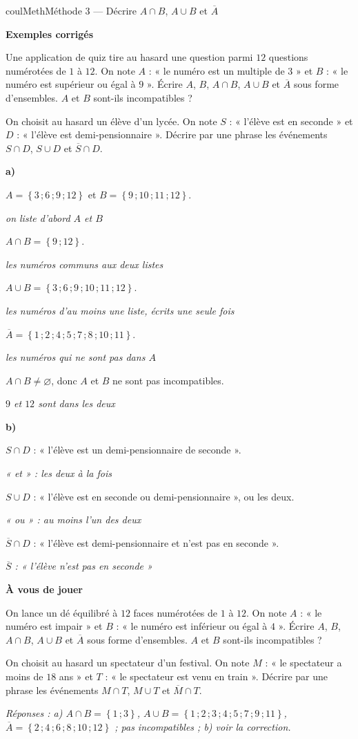 \documentclass[11pt,a4paper]{article}
\makeatletter
\newcommand{\lycee@ens}[1]{\left\{#1\right\}}
\providecommand{\ens}{\lycee@ens}}
\newcounter{lycee@signet}
\newcommand{\signet}[3][]{\stepcounter{lycee@signet}%
  \edef\lycee@dest{\if\relax\detokenize{#1}\relax
    signet.\arabic{lycee@signet}\else#1\fi}%
  \hypertarget{\lycee@dest}{}\bookmark[level=#2,dest=\lycee@dest]{#3}}
\newcommand{\res}[1]{#1}
\newcounter{methode}
\newenvironment{methodebox}[1][Méthode]{\stepcounter{methode}%
  \begin{boitecours}[phantom={\signet[methode-\arabic{methode}]{2}{#1}}]{coulMeth}{#1}}%
  {\end{boitecours}}
\newcommand{\etape}[1]{\par\smallskip\textbf{\color{coulMeth}#1}\par\nobreak\smallskip}
\newcommand{\reponse}[1]{\par\smallskip
  {\footnotesize\itshape\color{black!55}Réponses : #1}}
\newcommand{\explique}[2]{\par\smallskip\noindent
  \begin{minipage}[t]{0.57\linewidth}\raggedright #1\end{minipage}\hfill
  \begin{minipage}[t]{0.40\linewidth}\raggedright\leavevmode
    {\small\itshape\color{black!60}#2}\end{minipage}\par}
\newcommand{\cas}[1]{\par\smallskip\noindent\textbf{\color{coulExo}#1}\vadjust{\nobreak}}
\newenvironment{correction}{\par}{\par}
\newcommand{\etapeexemples}{\etape{Exemples corrigés}}
\makeatother
\begin{document}
\begin{methodebox}[Méthode 3 --- Décrire $A\cap B$, $A\cup B$ et $\overline{A}$]
\etapeexemples
\begin{questions}[label=\alph*)]
  \item Une application de quiz tire au hasard une question parmi $12$ questions
    numérotées de $1$ à $12$. On note $A$ : « le numéro est un multiple de $3$ » et
    $B$ : « le numéro est supérieur ou égal à $9$ ». Écrire $A$, $B$, $A\cap B$,
    $A\cup B$ et $\overline{A}$ sous forme d'ensembles. $A$ et $B$ sont-ils
    incompatibles ?
  \item On choisit au hasard un élève d'un lycée. On note $S$ : « l'élève est en
    seconde » et $D$ : « l'élève est demi-pensionnaire ». Décrire par une phrase les
    événements $S\cap D$, $S\cup D$ et $\overline{S}\cap D$.
\end{questions}
\begin{correction}
\cas{a)}
\explique{$A=\ens{3\,;6\,;9\,;12}$ et $B=\ens{9\,;10\,;11\,;12}$.}{on liste d'abord
$A$ et $B$}
\explique{$A\cap B=\res{\ens{9\,;12}}$.}{les numéros communs aux deux listes}
\explique{$A\cup B=\res{\ens{3\,;6\,;9\,;10\,;11\,;12}}$.}{les numéros d'au moins une
liste, écrits une seule fois}
\explique{$\overline{A}=\res{\ens{1\,;2\,;4\,;5\,;7\,;8\,;10\,;11}}$.}{les numéros qui ne
sont pas dans $A$}
\explique{$A\cap B\ne\varnothing$, donc \res{$A$ et $B$ ne sont pas
incompatibles}.}{$9$ et $12$ sont dans les deux}
\cas{b)}
\explique{$S\cap D$ : \res{« l'élève est un demi-pensionnaire de seconde »}.}{« et » :
les deux à la fois}
\explique{$S\cup D$ : \res{« l'élève est en seconde ou demi-pensionnaire »}, ou les
deux.}{« ou » : au moins l'un des deux}
\explique{$\overline{S}\cap D$ : \res{« l'élève est demi-pensionnaire et n'est pas
en seconde »}.}{$\overline{S}$ : « l'élève n'est pas en seconde »}
\end{correction}

\etape{À vous de jouer}
\begin{questions}[label=\alph*)]
  \item On lance un dé équilibré à $12$ faces numérotées de $1$ à $12$. On note
    $A$ : « le numéro est impair » et $B$ : « le numéro est inférieur ou égal à
    $4$ ». Écrire $A$, $B$, $A\cap B$, $A\cup B$ et $\overline{A}$ sous forme
    d'ensembles. $A$ et $B$ sont-ils incompatibles ?
  \item On choisit au hasard un spectateur d'un festival. On note $M$ : « le
    spectateur a moins de $18$ ans » et $T$ : « le spectateur est venu en train ».
    Décrire par une phrase les événements $M\cap T$, $M\cup T$ et $\overline{M}\cap T$.
\end{questions}
\reponse{a) $A\cap B=\ens{1\,;3}$, $A\cup B=\ens{1\,;2\,;3\,;4\,;5\,;7\,;9\,;11}$,
$\overline{A}=\ens{2\,;4\,;6\,;8\,;10\,;12}$ ; pas incompatibles ; b) voir la correction.}
\end{methodebox}
\end{document}
